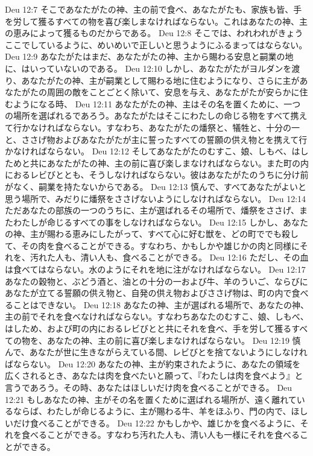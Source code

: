 Deu 12:7  そこであなたがたの神、主の前で食べ、あなたがたも、家族も皆、手を労して獲るすべての物を喜び楽しまなければならない。これはあなたの神、主の恵みによって獲るものだからである。
Deu 12:8  そこでは、われわれがきょうここでしているように、めいめいで正しいと思うようにふるまってはならない。
Deu 12:9  あなたがたはまだ、あなたがたの神、主から賜わる安息と嗣業の地に、はいっていないのである。
Deu 12:10  しかし、あなたがたがヨルダンを渡り、あなたがたの神、主が嗣業として賜わる地に住むようになり、さらに主があなたがたの周囲の敵をことごとく除いて、安息を与え、あなたがたが安らかに住むようになる時、
Deu 12:11  あなたがたの神、主はその名を置くために、一つの場所を選ばれるであろう。あなたがたはそこにわたしの命じる物をすべて携えて行かなければならない。すなわち、あなたがたの燔祭と、犠牲と、十分の一と、ささげ物およびあなたがたが主に誓ったすべての誓願の供え物とを携えて行かなければならない。
Deu 12:12  そしてあなたがたのむすこ、娘、しもべ、はしためと共にあなたがたの神、主の前に喜び楽しまなければならない。また町の内におるレビびととも、そうしなければならない。彼はあなたがたのうちに分け前がなく、嗣業を持たないからである。
Deu 12:13  慎んで、すべてあなたがよいと思う場所で、みだりに燔祭をささげないようにしなければならない。
Deu 12:14  ただあなたの部族の一つのうちに、主が選ばれるその場所で、燔祭をささげ、またわたしが命じるすべての事をしなければならない。
Deu 12:15  しかし、あなたの神、主が賜わる恵みにしたがって、すべて心に好む獣を、どの町ででも殺して、その肉を食べることができる。すなわち、かもしかや雄じかの肉と同様にそれを、汚れた人も、清い人も、食べることができる。
Deu 12:16  ただし、その血は食べてはならない。水のようにそれを地に注がなければならない。
Deu 12:17  あなたの穀物と、ぶどう酒と、油との十分の一および牛、羊のういご、ならびにあなたが立てる誓願の供え物と、自発の供え物およびささげ物は、町の内で食べることはできない。
Deu 12:18  あなたの神、主が選ばれる場所で、あなたの神、主の前でそれを食べなければならない。すなわちあなたのむすこ、娘、しもべ、はしため、および町の内におるレビびとと共にそれを食べ、手を労して獲るすべての物を、あなたの神、主の前に喜び楽しまなければならない。
Deu 12:19  慎んで、あなたが世に生きながらえている間、レビびとを捨てないようにしなければならない。
Deu 12:20  あなたの神、主が約束されたように、あなたの領域を広くされるとき、あなたは肉を食べたいと願って、『わたしは肉を食べよう』と言うであろう。その時、あなたはほしいだけ肉を食べることができる。
Deu 12:21  もしあなたの神、主がその名を置くために選ばれる場所が、遠く離れているならば、わたしが命じるように、主が賜わる牛、羊をほふり、門の内で、ほしいだけ食べることができる。
Deu 12:22  かもしかや、雄じかを食べるように、それを食べることができる。すなわち汚れた人も、清い人も一様にそれを食べることができる。

